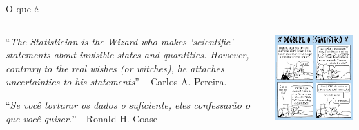 \documentclass{beamer}
\begin{document}
\begin{frame}{O que é}
  \begin{columns}
    \begin{column}{7cm}
      \begin{block}{}
        {\scriptsize ``{\em The Statistician is the Wizard who makes
            `scientific' statements about invisible states and
            quantities. However, contrary to the real wishes (or
            witches), he attaches uncertainties to his statements}'' –
          Carlos A.  Pereira.}
      \end{block}
      \begin{block}{}
        {\scriptsize ``{\em Se você torturar os dados o suficiente,
            eles confessarão o que você quiser.}'' - Ronald H. Coase}
      \end{block}

    \end{column}
    \begin{column}{3cm}
      \begin{center}
        \includegraphics[width=1.6\textwidth]{Intro/dilbert}
      \end{center}
    \end{column}
  \end{columns}
\end{frame}
\end{document}
